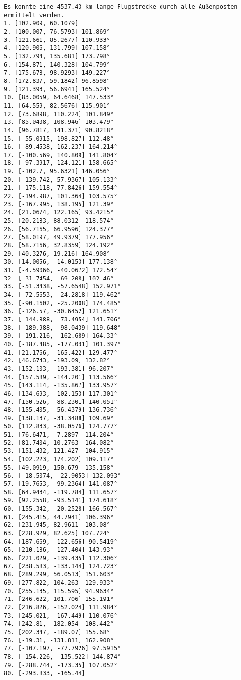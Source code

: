 \documentclass[a4paper,10pt,ngerman]{scrartcl}
\begin{document}
    \begin{lstlisting}[frame=single, title=Programmausgabe wenigerkrumm6.txt, breaklines=true,label={lst:lstlisting4}]
Es konnte eine 4537.43 km lange Flugstrecke durch alle Außenposten ermittelt werden.
1. [102.909, 60.1079]
2. [100.007, 76.5793] 101.869°
3. [121.661, 85.2677] 110.933°
4. [120.906, 131.799] 107.158°
5. [132.794, 135.681] 173.798°
6. [154.871, 140.328] 104.799°
7. [175.678, 98.9293] 149.227°
8. [172.837, 59.1842] 96.8598°
9. [121.393, 56.6941] 165.524°
10. [83.0059, 64.6468] 147.533°
11. [64.559, 82.5676] 115.901°
12. [73.6898, 110.224] 101.849°
13. [85.0438, 108.946] 103.479°
14. [96.7817, 141.371] 90.8218°
15. [-55.0915, 198.827] 112.48°
16. [-89.4538, 162.237] 164.214°
17. [-100.569, 140.809] 141.804°
18. [-97.3917, 124.121] 158.665°
19. [-102.7, 95.6321] 146.056°
20. [-139.742, 57.9367] 105.133°
21. [-175.118, 77.8426] 159.554°
22. [-194.987, 101.364] 103.575°
23. [-167.995, 138.195] 121.39°
24. [21.0674, 122.165] 93.4215°
25. [20.2183, 88.0312] 118.574°
26. [56.7165, 66.9596] 124.377°
27. [58.0197, 49.9379] 177.956°
28. [58.7166, 32.8359] 124.192°
29. [40.3276, 19.216] 164.908°
30. [14.0056, -14.0153] 177.138°
31. [-4.59066, -40.0672] 172.54°
32. [-31.7454, -69.208] 102.46°
33. [-51.3438, -57.6548] 152.971°
34. [-72.5653, -24.2818] 119.462°
35. [-90.1602, -25.2008] 174.485°
36. [-126.57, -30.6452] 121.651°
37. [-144.888, -73.4954] 141.706°
38. [-189.988, -98.0439] 119.648°
39. [-191.216, -162.689] 164.33°
40. [-187.485, -177.031] 101.397°
41. [21.1766, -165.422] 129.477°
42. [46.6743, -193.09] 132.82°
43. [152.103, -193.381] 96.207°
44. [157.589, -144.201] 113.566°
45. [143.114, -135.867] 133.957°
46. [134.693, -102.153] 117.301°
47. [150.526, -88.2301] 140.051°
48. [155.405, -56.4379] 136.736°
49. [138.137, -31.3488] 109.69°
50. [112.833, -38.0576] 124.777°
51. [76.6471, -7.2897] 114.204°
52. [81.7404, 10.2763] 164.082°
53. [151.432, 121.427] 104.915°
54. [102.223, 174.202] 109.117°
55. [49.0919, 150.679] 135.158°
56. [-18.5074, -22.9053] 132.093°
57. [19.7653, -99.2364] 141.087°
58. [64.9434, -119.784] 111.657°
59. [92.2558, -93.5141] 174.618°
60. [155.342, -20.2528] 166.567°
61. [245.415, 44.7941] 106.396°
62. [231.945, 82.9611] 103.08°
63. [228.929, 82.625] 107.724°
64. [187.669, -122.656] 90.5419°
65. [210.186, -127.404] 143.93°
66. [221.029, -139.435] 112.306°
67. [238.583, -133.144] 124.723°
68. [289.299, 56.0513] 151.603°
69. [277.822, 104.263] 129.933°
70. [255.135, 115.595] 94.9634°
71. [246.622, 101.706] 155.191°
72. [216.826, -152.024] 111.984°
73. [245.021, -167.449] 110.076°
74. [242.81, -182.054] 108.442°
75. [202.347, -189.07] 155.68°
76. [-19.31, -131.811] 162.908°
77. [-107.197, -77.7926] 97.5915°
78. [-154.226, -135.522] 144.874°
79. [-288.744, -173.35] 107.052°
80. [-293.833, -165.44]
    \end{lstlisting}
\end{document}
